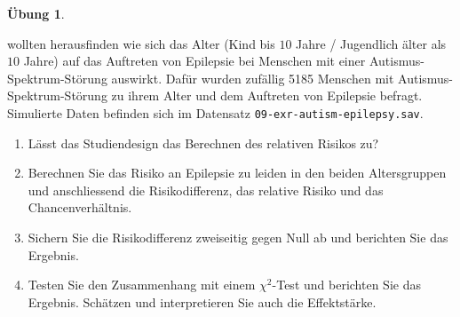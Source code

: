 \documentclass[
]{book}
\providecommand{\tightlist}{%
  \setlength{\itemsep}{0pt}\setlength{\parskip}{0pt}}
\theoremstyle{definition}
\theoremstyle{definition}
\theoremstyle{definition}
\newtheorem{exercise}{Übung}[chapter]
\theoremstyle{definition}
\theoremstyle{remark}
\begin{document}
\begin{exercise}
\protect\hypertarget{exr:autism-epilepsy}{}\label{exr:autism-epilepsy}\leavevmode

\citet{viscidi2013} wollten herausfinden wie sich das Alter (Kind bis \(10\)
Jahre / Jugendlich älter als \(10\) Jahre) auf das Auftreten von Epilepsie
bei Menschen mit einer Autismus-Spektrum-Störung auswirkt. Dafür wurden
zufällig 5185 Menschen mit
Autismus-Spektrum-Störung zu ihrem Alter und dem Auftreten von Epilepsie
befragt. Simulierte Daten befinden sich im Datensatz
\texttt{09-exr-autism-epilepsy.sav}.

\begin{enumerate}
\def\labelenumi{\alph{enumi})}
\tightlist
\item
  Lässt das Studiendesign das Berechnen des relativen Risikos zu?
\item
  Berechnen Sie das Risiko an Epilepsie zu leiden in den beiden Altersgruppen und anschliessend die Risikodifferenz, das relative Risiko und das Chancenverhältnis.
\item
  Sichern Sie die Risikodifferenz zweiseitig gegen Null ab und
  berichten Sie das Ergebnis.
\item
  Testen Sie den Zusammenhang mit einem \(\chi^2\)-Test und berichten
  Sie das Ergebnis. Schätzen und interpretieren Sie auch die Effektstärke.
\end{enumerate}

\end{exercise}
\end{document}
